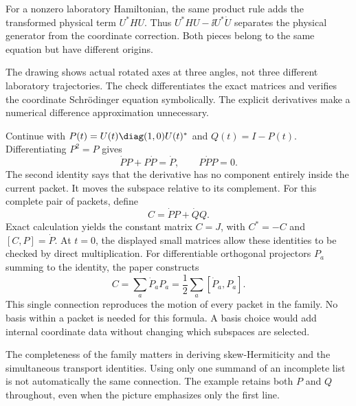 For a nonzero laboratory Hamiltonian, the same product rule adds the transformed physical term $U^*HU$. Thus $U^*HU-\ii U^*\dot U$ separates the physical generator from the coordinate correction. Both pieces belong to the same equation but have different origins.

The drawing shows actual rotated axes at three angles, not three different laboratory trajectories. The check differentiates the exact matrices and verifies the coordinate Schr\"odinger equation symbolically. The explicit derivatives make a numerical difference approximation unnecessary.

Continue with $P(t)=U(t)\diag(1,0)U(t)^*$ and $Q(t)=I-P(t)$. Differentiating $P^2=P$ gives
\[
\dot P P+P\dot P=\dot P,
\qquad P\dot P P=0.
\]
The second identity says that the derivative has no component entirely inside the current packet. It moves the subspace relative to its complement.
For this complete pair of packets, define
\[
C=\dot P P+\dot Q Q.
\]
Exact calculation yields the constant matrix $C=J$, with $C^*=-C$ and $[C,P]=\dot P$. At $t=0$, the displayed small matrices allow these identities to be checked by direct multiplication.
For differentiable orthogonal projectors $P_a$ summing to the identity, the paper constructs
\[
C=\sum_a\dot P_aP_a=\frac12\sum_a[\dot P_a,P_a].
\]
This single connection reproduces the motion of every packet in the family. No basis within a packet is needed for this formula. A basis choice would add internal coordinate data without changing which subspaces are selected.

The completeness of the family matters in deriving skew-Hermiticity and the simultaneous transport identities. Using only one summand of an incomplete list is not automatically the same connection. The example retains both $P$ and $Q$ throughout, even when the picture emphasizes only the first line.

